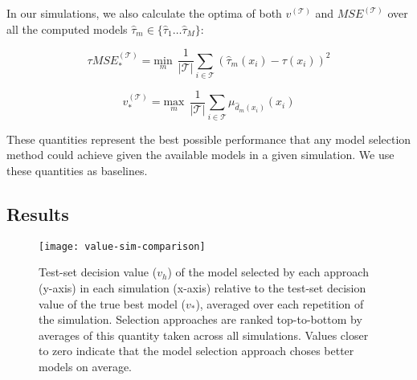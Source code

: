 In our simulations, we also calculate the optima of both $v^{(\mathcal{T})}$ and $MSE^{(\mathcal{T})}$ over all the computed models $\hat\tau_m \in \{\hat\tau_1 \dots \hat\tau_M\}$:

\[
\tau MSE^{(\mathcal{T})}_{*} = \underset{m}{\text{min}} \ \ \frac{1}{|\mathcal{T}|}\sum_{i \in \mathcal{T}} (\hat\tau_m (x_i) - \tau(x_i))^2
\]

\[
v^{(\mathcal{T})}_{*} = \underset{m}{\text{max}} \ \ \frac{1}{|\mathcal{T}|}\sum_{i \in \mathcal{T}} \mu_{\hat d_m(x_i)}(x_i)
\]

These quantities represent the best possible performance that any model selection method could achieve given the available models in a given simulation. We use these quantities as baselines.

\begin{comment}
We also calculate these using the true model $\hat\tau = \tau$, which represents the best achievable performance without specifying any models a-priori:

\[
\tau MSE^{(\mathcal{T})}_{**} = 0
\]

\[
v^{(\mathcal{T})}_{**} = \frac{1}{|\mathcal{T}|}\sum_{i \in \mathcal{T}} \mu_{ d(x_i)}(x_i)
\]

We use these minima to calculate the improvements obtained by each model selection approach relative to optimal baselines, which allows for comparison between different simulations. The relative values of $\tau MSE^{(\mathcal{T})}_{h}$ and $C^{(\mathcal{T})}_{h}$ within one test set and one set of models are

\[
	R\text{-} \tau MSE^{(\mathcal{T})}_{h} = 
	\frac{\tau MSE^{(\mathcal{T})}_{h} - \tau MSE^{(\mathcal{T})}_{**}}{\tau MSE^{(\mathcal{T})}_{*} - \tau MSE^{(\mathcal{T})}_{**}}
\]

\[
	R\text{-}  v^{(\mathcal{T})}_{h} = 
	\frac{ v^{(\mathcal{T})}_{h} -  v^{(\mathcal{T})}_{**}}{ v^{(\mathcal{T})}_{*} -  v^{(\mathcal{T})}_{**}}
\]

The closer to zero these are, the better the performance of the model selection method.
\end{comment}

\subsection{Results}

\begin{figure}
\centering
\texttt{[image: value-sim-comparison]}
\caption{Test-set decision value ($v_h$) of the model selected by each approach (y-axis) in each simulation (x-axis) relative to the test-set decision value of the true best model ($v_*$), averaged over each repetition of the simulation. Selection approaches are ranked top-to-bottom by averages of this quantity taken across all simulations. Values closer to zero indicate that the model selection approach choses better models on average.}
\end{figure}

